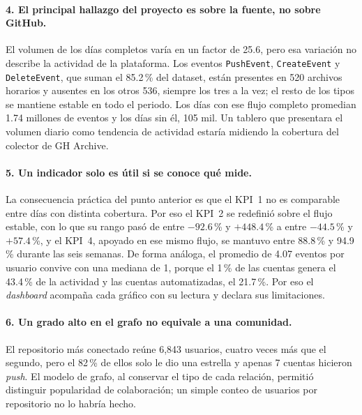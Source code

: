 \paragraph{4. El principal hallazgo del proyecto es sobre la fuente, no sobre GitHub.} El volumen de los días completos varía en un factor de 25.6, pero esa variación no describe la actividad de la plataforma. Los eventos \texttt{PushEvent}, \texttt{CreateEvent} y \texttt{DeleteEvent}, que suman el 85.2\,\% del dataset, están presentes en 520 archivos horarios y ausentes en los otros 536, siempre los tres a la vez; el resto de los tipos se mantiene estable en todo el periodo. Los días con ese flujo completo promedian 1.74 millones de eventos y los días sin él, 105 mil. Un tablero que presentara el volumen diario como \guillemotleft{}tendencia de actividad\guillemotright{} estaría midiendo la cobertura del colector de GH Archive.

\paragraph{5. Un indicador solo es útil si se conoce qué mide.} La consecuencia práctica del punto anterior es que el KPI~1 no es comparable entre días con distinta cobertura. Por eso el KPI~2 se redefinió sobre el flujo estable, con lo que su rango pasó de entre $-92.6$\,\% y $+448.4$\,\% a entre $-44.5$\,\% y $+57.4$\,\%, y el KPI~4, apoyado en ese mismo flujo, se mantuvo entre 88.8\,\% y 94.9\,\% durante las seis semanas. De forma análoga, el promedio de 4.07 eventos por usuario convive con una mediana de 1, porque el 1\,\% de las cuentas genera el 43.4\,\% de la actividad y las cuentas automatizadas, el 21.7\,\%. Por eso el \textit{dashboard} acompaña cada gráfico con su lectura y declara sus limitaciones.

\paragraph{6. Un grado alto en el grafo no equivale a una comunidad.} El repositorio más conectado reúne 6,843 usuarios, cuatro veces más que el segundo, pero el 82\,\% de ellos solo le dio una estrella y apenas 7 cuentas hicieron \textit{push}. El modelo de grafo, al conservar el tipo de cada relación, permitió distinguir popularidad de colaboración; un simple conteo de usuarios por repositorio no lo habría hecho.

